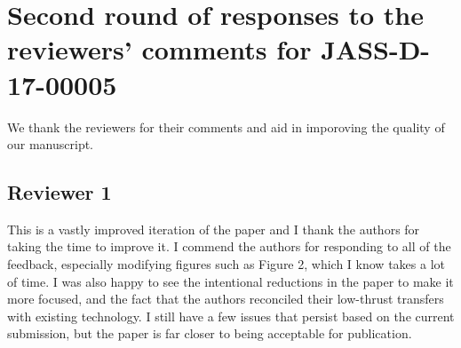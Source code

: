 \documentclass[11pt]{article}
\begin{document}

\section*{Second round of responses to the reviewers' comments for JASS-D-17-00005}

We thank the reviewers for their comments and aid in imporoving the quality of our manuscript.

\subsection*{Reviewer 1}
\begin{itshape}
This is a vastly improved iteration of the paper and I thank the authors for taking the time to improve it.  I commend the authors for responding to all of the feedback, especially modifying figures such as Figure 2, which I know takes a lot of time.  I was also happy to see the intentional reductions in the paper to make it more focused, and the fact that the authors reconciled their low-thrust transfers with existing technology.  I still have a few issues that persist based on the current submission, but the paper is far closer to being acceptable for publication.
\end{itshape}
\end{document}
